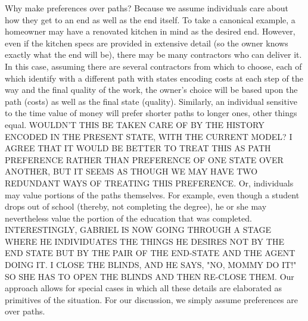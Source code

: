 \documentclass[
11pt,
titlepage,
reqno,
]{article}%
\theoremstyle{definition}
\begin{document}
	Why make preferences over paths? Because we assume individuals care about how they get to an end as well as the end itself. 
	To take a canonical example, a homeowner may have a renovated kitchen in mind as the desired end. 
	However, even if the kitchen specs are provided in extensive detail (so the owner knows exactly what the end will be), there may be many contractors who can deliver it. 
	In this case, assuming there are several contractors from which to choose, each of which identify with a different path with states encoding costs  at each step of the way and the final quality of the work, the owner's choice will be based upon the path (costs) as well as the final state (quality). 
	Similarly, an individual sensitive to the time value of money will prefer shorter paths to longer ones, other things equal. 
	WOULDN'T THIS BE TAKEN CARE OF BY THE HISTORY ENCODED IN THE PRESENT STATE, WITH THE CURRENT MODEL? I AGREE THAT IT WOULD BE BETTER TO TREAT THIS AS PATH PREFERENCE RATHER THAN PREFERENCE OF ONE STATE OVER ANOTHER, BUT IT SEEMS AS THOUGH WE MAY HAVE TWO REDUNDANT WAYS OF TREATING THIS PREFERENCE. 
	Or, individuals may value portions of the paths themselves.
	For example, even though a student drops out of school (thereby, not completing the degree), he or she may nevertheless value the portion of the education that was completed. 
	INTERESTINGLY, GABRIEL IS NOW GOING THROUGH A STAGE WHERE HE INDIVIDUATES THE THINGS HE DESIRES NOT BY THE END STATE BUT BY THE PAIR OF THE END-STATE AND THE AGENT DOING IT. I CLOSE THE BLINDS, AND HE SAYS, "NO, MOMMY DO IT!" SO SHE HAS TO OPEN THE BLINDS AND THEN RE-CLOSE THEM.
	Our approach allows for special cases in which all these details are elaborated as primitives of the situation. For our discussion, we simply assume preferences are over paths.    %
	
\end{document}
